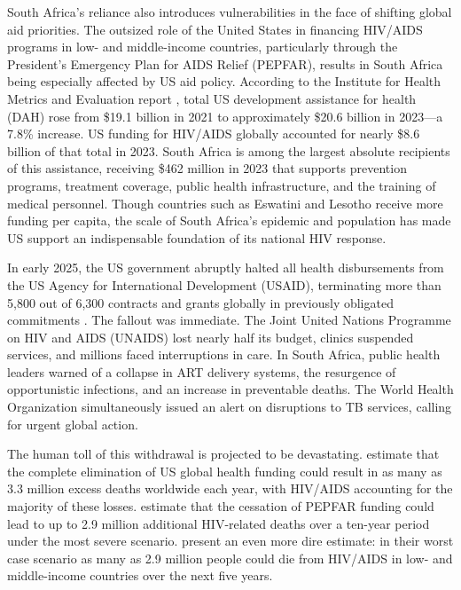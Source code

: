 \documentclass[letterpaper,12pt]{article}
\theoremstyle{definition}
\begin{document}
\begin{spacing}{1.5}
South Africa's reliance also introduces vulnerabilities in the face of shifting global aid priorities. The outsized role of the United States in financing HIV/AIDS programs in low- and middle-income countries, particularly through the President's Emergency Plan for AIDS Relief (PEPFAR), results in South Africa being especially affected by US aid policy. According to the Institute for Health Metrics and Evaluation report \citep{FGH2023}, total US development assistance for health (DAH) rose from \$19.1 billion in 2021 to approximately \$20.6 billion in 2023—a 7.8\% increase. US funding for HIV/AIDS globally accounted for nearly \$8.6 billion of that total in 2023. South Africa is among the largest absolute recipients of this assistance, receiving \$462 million in 2023 that supports prevention programs, treatment coverage, public health infrastructure, and the training of medical personnel. Though countries such as Eswatini and Lesotho receive more funding per capita, the scale of South Africa's epidemic and population has made US support an indispensable foundation of its national HIV response.

In early 2025, the US government abruptly halted all health disbursements from the US Agency for International Development (USAID), terminating more than 5,800 out of 6,300 contracts and grants globally in previously obligated commitments \citep{Cohen2025}. The fallout was immediate. The Joint United Nations Programme on HIV and AIDS (UNAIDS) lost nearly half its budget, clinics suspended services, and millions faced interruptions in care. In South Africa, public health leaders warned of a collapse in ART delivery systems, the resurgence of opportunistic infections, and an increase in preventable deaths. The World Health Organization simultaneously issued an alert on disruptions to TB services, calling for urgent global action.

The human toll of this withdrawal is projected to be devastating. \citet{KS2025} estimate that the complete elimination of US global health funding could result in as many as 3.3 million excess deaths worldwide each year, with HIV/AIDS accounting for the majority of these losses. \citet{Gandhi2025} estimate that the cessation of PEPFAR funding could lead to up to 2.9 million additional HIV-related deaths over a ten-year period under the most severe scenario.  present an even more dire estimate: in their worst case scenario as many as 2.9 million people could die from HIV/AIDS in low- and middle-income countries over the next five years.


\end{spacing}
\end{document}
